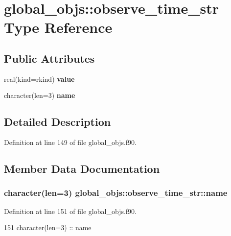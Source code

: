 \section{global\+\_\+objs\+:\+:observe\+\_\+time\+\_\+str Type Reference}
\label{structglobal__objs_1_1observe__time__str}
\subsection*{Public Attributes}
\begin{DoxyCompactItemize}
\item 
real(kind=rkind) {\bf value}
\item 
character(len=3) {\bf name}
\end{DoxyCompactItemize}


\subsection{Detailed Description}


Definition at line 149 of file global\+\_\+objs.\+f90.



\subsection{Member Data Documentation}
\subsubsection[{name}]{\setlength{\rightskip}{0pt plus 5cm}character(len=3) global\+\_\+objs\+::observe\+\_\+time\+\_\+str\+::name}\label{structglobal__objs_1_1observe__time__str_a1ed67f92ca8687117e1c12511f5ef654}


Definition at line 151 of file global\+\_\+objs.\+f90.


\begin{DoxyCode}
151     \textcolor{keywordtype}{character(len=3)} :: name
\end{DoxyCode}
